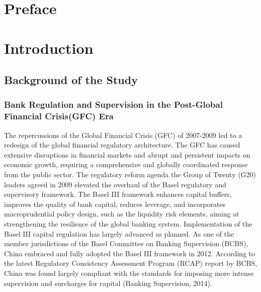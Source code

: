 \documentclass[
  12pt,
  a4paper,
]{scrreprt}
\renewcommand*\contentsname{Table of contents}
\newcommand\contentsname{Table of contents}
\begin{document}
  
\renewcommand*\contentsname{Table of contents}
{
\hypersetup{linkcolor=}
\setcounter{tocdepth}{2}
\tableofcontents
}


\chapter*{Preface}\label{preface}



\chapter{Introduction}\label{introduction}

\section{Background of the Study}\label{background-of-the-study}

\subsection{Bank Regulation and Supervision in the Post-Global Financial
Crisis(GFC)
Era}\label{bank-regulation-and-supervision-in-the-post-global-financial-crisisgfc-era}

The repercussions of the Global Financial Crisis (GFC) of 2007-2009 led
to a redesign of the global financial regulatory architecture. The GFC
has caused extensive disruptions in financial markets and abrupt and
persistent impacts on economic growth, requiring a comprehensive and
globally coordinated response from the public sector. The regulatory
reform agenda the Group of Twenty (G20) leaders agreed in 2009 elevated
the overhaul of the Basel regulatory and supervisory framework. The
Basel III framework enhances capital buffers, improves the quality of
bank capital, reduces leverage, and incorporates macroprudential policy
design, such as the liquidity risk elements, aiming at strengthening the
resilience of the global banking system. Implementation of the Basel III
capital regulation has largely advanced as planned. As one of the member
jurisdictions of the Basel Committee on Banking Supervision (BCBS),
China embraced and fully adopted the Basel III framework in 2012.
According to the latest Regulatory Consistency Assessment Program (RCAP)
report by BCBS, China was found largely compliant with the standards for
imposing more intense supervision and surcharges for capital (Banking
Supervision, 2014).
\end{document}
